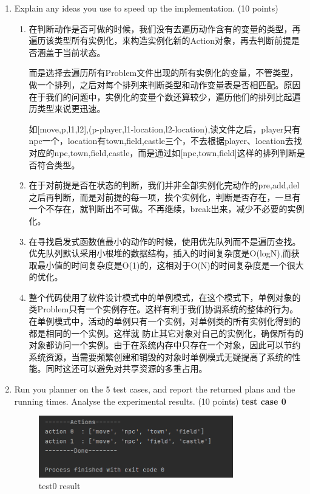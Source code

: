 \documentclass[a4paper, 11pt]{article}
\begin{document}
\begin{enumerate}
\item Explain any ideas you use to speed up the implementation. (10 points)
\begin{enumerate}
\item 在判断动作是否可做的时候，我们没有去遍历动作含有的变量的类型，再遍历该类型所有实例化，来构造实例化新的Action对象，再去判断前提是否涵盖于当前状态。
	
	而是选择去遍历所有Problem文件出现的所有实例化的变量，不管类型，做一个排列，之后对每个排列来判断类型和动作变量表是否相匹配。原因在于我们的问题中，实例化的变量个数还算较少，遍历他们的排列比起遍历类型来说更迅速。
	
	如[move,p,l1,l2],(p-player,l1-location,l2-location),读文件之后，player只有npc一个，location有town,field,castle三个，不去根据player、location去找对应的npc,town,field,castle，而是通过如[npc,town,field]这样的排列判断是否符合类型。
\item 在于对前提是否在状态的判断，我们并非全部实例化完动作的pre,add,del之后再判断，而是对前提的每一项，挨个实例化，判断是否存在，一旦有一个不存在，就判断出不可做。不再继续，break出来，减少不必要的实例化。
\item 在寻找启发式函数值最小的动作的时候，使用优先队列而不是遍历查找。优先队列默认采用小根堆的数据结构，插入的时间复杂度是O(logN),而获取最小值的时间复杂度是O(1)的，这相对于O(N)的时间复杂度是一个很大的优化。
\item 整个代码使用了软件设计模式中的单例模式，在这个模式下，单例对象的类Problem只有一个实例存在。这样有利于我们协调系统的整体的行为。在单例模式中，活动的单例只有一个实例，对单例类的所有实例化得到的都是相同的一个实例。这样就 防止其它对象对自己的实例化，确保所有的对象都访问一个实例。由于在系统内存中只存在一个对象，因此可以节约系统资源，当需要频繁创建和销毁的对象时单例模式无疑提高了系统的性能。同时这还可以避免对共享资源的多重占用。
\end{enumerate}

\item Run you planner on the 5 test cases, and report the returned plans and the running times. Analyse the experimental results. (10 points)
\textbf{test case 0}
	\begin{figure}[H]
	\centering
	\includegraphics[width=0.8\textwidth]{Pic/test0.png}
	\caption{test0 result}
	\end{figure}
	


\end{enumerate}
\end{document}
